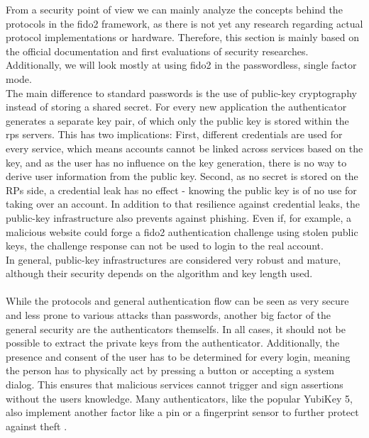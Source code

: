 From a security point of view we can mainly analyze the concepts behind the protocols in the \ac{fido2} framework, as there is not yet any research regarding actual protocol implementations or hardware. Therefore, this section is mainly based on the official documentation and first evaluations of security researches. Additionally, we will look mostly at using \ac{fido2} in the passwordless, single factor mode.\\
The main difference to standard passwords is the use of public-key cryptography instead of storing a shared secret. For every new application the authenticator generates a separate key pair, of which only the public key is stored within the \acp{rp} servers. This has two implications: First, different credentials are used for every service, which means accounts cannot be linked across services based on the key, and as the user has no influence on the key generation, there is no way to derive user information from the public key. Second, as no secret is stored on the RPs side, a credential leak has no effect - knowing the public key is of no use for taking over an account. In addition to that resilience against credential leaks, the public-key infrastructure also prevents against phishing. Even if, for example, a malicious website could forge a \ac{fido2} authentication challenge using stolen public keys, the challenge response can not be used to login to the real account.\\
In general, public-key infrastructures are considered very robust and mature, although their security depends on the algorithm and key length used.\\
\\
While the protocols and general authentication flow can be seen as very secure and less prone to various attacks than passwords, another big factor of the general security are the authenticators themselfs. In all cases, it should not be possible to extract the private keys from the authenticator. Additionally, the presence and consent of the user has to be determined for every login, meaning the person has to physically act by pressing a button or accepting a system dialog. This ensures that malicious services cannot trigger and sign assertions without the users knowledge. Many authenticators, like the popular YubiKey 5, also implement another factor like a \ac{pin} or a fingerprint sensor to further protect against theft \cite{yubikey_5_nfc}.


